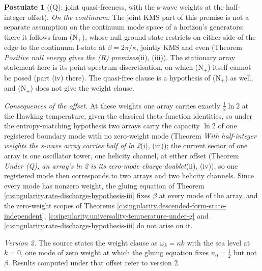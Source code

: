 \documentclass[11pt]{article}
\theoremstyle{definition}
\newtheorem{postulate}[theorem]{Postulate}
\theoremstyle{plain}
\begin{document}
\begin{postulate}[(Q): joint quasi-freeness, with the s-wave weights at the half-integer offset]
\emph{On the continuum.} The joint KMS part of this premise is not a separate assumption on the continuum mode space of a horizon's generators: there it follows from (N$_{+}$), whose null ground state restricts on either side of the edge to the continuum I-state at $\beta = 2\pi/\kappa$, jointly KMS and even (Theorem \emph{Positive null energy gives the (R) premises}(ii), (iii)). The stationary array statement here is its point-spectrum discretisation, on which (N$_{+}$) itself cannot be posed (part (iv) there). The quasi-free clause is a hypothesis of (N$_{+}$) as well, and (N$_{+}$) does not give the weight clause.

\emph{Consequences of the offset.} At these weights one array carries exactly $\tfrac12\ln 2$ at the Hawking temperature, given the classical theta-function identities, so under the entropy-matching hypothesis two arrays carry the capacity $\ln 2$ of one registered boundary mode with no zero-weight mode (Theorem \emph{With half-integer weights the s-wave array carries half of ln 2}(i), (iii)); the current sector of one array is one oscillator tower, one helicity channel, at either offset (Theorem \emph{Under (Q), an array's ln 2 is its zero-mode charge doublet}(ii), (iv)), so one registered mode then corresponds to two arrays and two helicity channels. Since every mode has nonzero weight, the gluing equation of Theorem \ref{c:singularity.rate-discharge-hypothesis-iii} fixes $\beta$ at every mode of the array, and the zero-weight scopes of Theorems \ref{c:singularity.descended-form-state-independent}, \ref{c:singularity.universality-temperature-under-g} and \ref{c:singularity.rate-discharge-hypothesis-iii} do not arise on it.

\emph{Version 2.} The source states the weight clause as $\omega_k = \kappa k$ with the sea level at $k = 0$, one mode of zero weight at which the gluing equation fixes $n_0 = \tfrac12$ but not $\beta$. Results computed under that offset refer to version 2.
\end{postulate}
\end{document}
